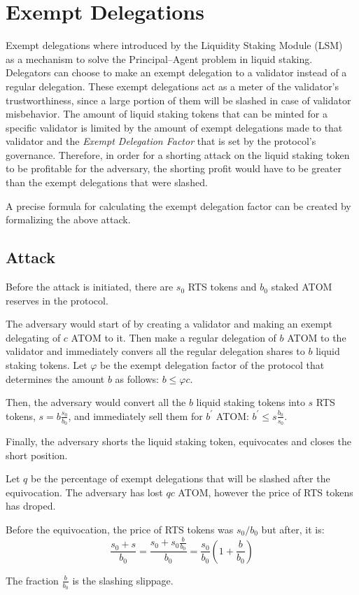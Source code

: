 \section{Exempt Delegations}

Exempt delegations where introduced by the Liquidity Staking Module
(LSM)~\cite{liquidity-staking-module} as a mechanism to solve the Principal--Agent problem in liquid
staking.
Delegators can choose to make an exempt delegation to a
validator instead of a regular delegation.
These exempt delegations act as a meter of the
validator's trustworthiness, since a large portion of them
will be slashed in case of validator misbehavior.
The amount of liquid staking tokens that can be
minted for a specific validator is limited by the amount of
exempt delegations made to that validator and the \emph{Exempt Delegation Factor}
that is set by the protocol's governance.
Therefore, in order for a shorting attack on the liquid staking
token to be profitable for the adversary, the shorting profit would
have to be greater than the exempt delegations that were slashed.

A precise formula for calculating the exempt delegation factor can be
created by formalizing the above attack.

\subsection{Attack}

Before the attack is initiated, there are $s_0$ RTS tokens and $b_0$
staked ATOM reserves in the protocol.

The adversary would start of by creating a validator and making an
exempt delegating of $c$ ATOM to it.
Then make a regular delegation of $b$ ATOM to the validator and
immediately convers all the regular delegation shares to $b$ liquid
staking tokens.
Let $\varphi$ be the exempt delegation factor of the protocol
that determines the amount $b$ as follows: $b \leq \varphi c$.

Then, the adversary would convert all the $b$ liquid staking tokens into
$s$ RTS tokens, $s = b \frac{s_0}{b_0}$, and immediately sell them for
$b^{'}$ ATOM: $b^{'} \leq s \frac{b_0}{s_0}$.

Finally, the adversary shorts the liquid staking token, equivocates
and closes the short position.

Let $q$ be the percentage of exempt delegations that will be slashed after
the equivocation. The adversary has lost $qc$ ATOM, however the price of RTS
tokens has droped.

Before the equivocation, the price of RTS tokens was $s_0/b_0$ but
after, it is:
\[
\frac{s_0 + s}{b_0} =
\frac{s_0 + s_0\frac{b}{b_0}}{b_0} =
\frac{s_0}{b_0} (1 + \frac{b}{b_0})
\]

The fraction $\frac{b}{b_0}$ is the slashing slippage.
